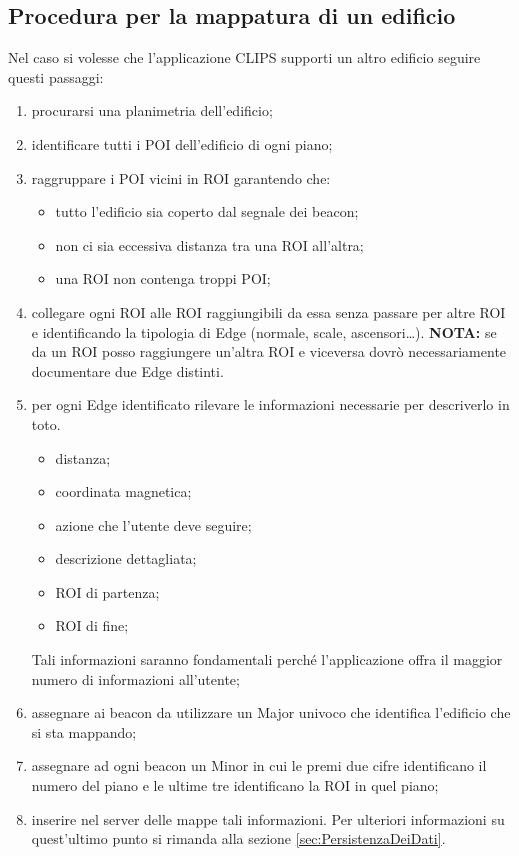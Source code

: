 \documentclass[../ManualeSviluppatore.tex]{subfiles}
\begin{document}
	\subsection{Procedura per la mappatura di un edificio}
		Nel caso si volesse che l'applicazione CLIPS supporti un altro edificio seguire questi passaggi:
		\begin{enumerate}
			\item procurarsi una planimetria dell'edificio;
			\item identificare tutti i POI dell'edificio di ogni piano;
			\item raggruppare i POI vicini in ROI garantendo che:
			\begin{itemize}
				\item tutto l'edificio sia coperto dal segnale dei beacon;
				\item non ci sia eccessiva distanza tra una ROI all'altra;
				\item una ROI non contenga troppi POI;
			\end{itemize}
			\item collegare ogni ROI alle ROI raggiungibili da essa senza passare per altre ROI e identificando la tipologia di Edge (normale, scale, ascensori\dots). \textbf{NOTA:} se da un ROI posso raggiungere un'altra ROI e viceversa dovrò necessariamente documentare due Edge distinti.
			\item per ogni Edge identificato rilevare le informazioni necessarie per descriverlo in toto. 
			\begin{itemize}
				\item distanza;
				\item coordinata magnetica;
				\item azione che l'utente deve seguire;
				\item descrizione dettagliata;
				\item ROI di partenza;
				\item ROI di fine;
			\end{itemize}
			Tali informazioni saranno fondamentali perché l'applicazione offra il maggior numero di informazioni all'utente;
			\item assegnare ai \gls{beacon} da utilizzare un Major univoco che identifica l'edificio che si sta mappando;
			\item assegnare ad ogni \gls{beacon} un Minor in cui le premi due cifre identificano il numero del piano e le ultime tre identificano la ROI in quel piano;
			\item inserire nel server delle mappe tali informazioni. Per ulteriori informazioni su quest'ultimo punto si rimanda alla sezione \ref{sec:PersistenzaDeiDati}.
		\end{enumerate}
		
\end{document}
